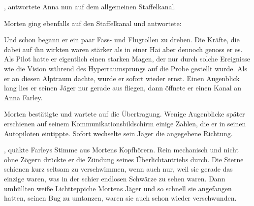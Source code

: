 \par

, antwortete Anna nun auf dem allgemeinen Staffelkanal. 

\par

Morten ging ebenfalls auf den Staffelkanal und antwortete: 

\par

Und schon begann er ein paar Fass- und Flugrollen zu drehen. Die Kräfte, die dabei auf ihn wirkten waren stärker als in einer Hai aber dennoch genoss er es. Als Pilot hatte er eigentlich einen starken Magen, der nur durch solche Ereignisse wie die Vision während des Hyperraumsprungs auf die Probe gestellt wurde. Als er an diesen Alptraum dachte, wurde er sofort wieder ernst. Einen Augenblick lang lies er seinen Jäger nur gerade aus fliegen, dann öffnete er einen Kanal an Anna Farley.

\par


\par


\par

Morten bestätigte und wartete auf die Übertragung. Wenige Augenblicke später erschienen auf seinem Kommunikationsbildschirm einige Zahlen, die er in seinen Autopiloten eintippte. Sofort wechselte sein Jäger die angegebene Richtung.

\par

, quäkte Farleys Stimme aus Mortens Kopfhörern.  Rein mechanisch und nicht ohne Zögern drückte er die Zündung seines Überlichtantriebs durch. Die Sterne schienen kurz seltsam zu verschwimmen, wenn auch nur, weil sie gerade das einzige waren, was in der schier endlosen Schwärze zu sehen waren. Dann umhüllten weiße Lichtteppiche Mortens Jäger und so schnell sie angefangen hatten, seinen Bug zu umtanzen, waren sie auch schon wieder verschwunden.
